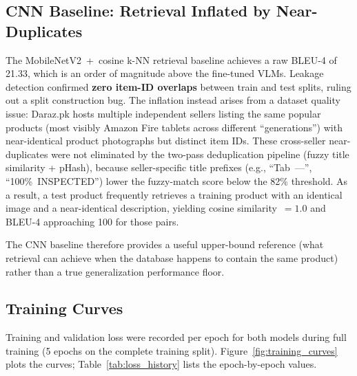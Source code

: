 \documentclass[12pt,a4paper]{article}
\begin{document}
\subsection{CNN Baseline: Retrieval Inflated by Near-Duplicates}
\label{sec:cnn_note}

The MobileNetV2~+~cosine k-NN retrieval baseline achieves a raw BLEU-4 of 21.33,
which is an order of magnitude above the fine-tuned VLMs. Leakage detection confirmed
\textbf{zero item-ID overlaps} between train and test splits, ruling out a split
construction bug. The inflation instead arises from a dataset quality issue: Daraz.pk
hosts multiple independent sellers listing the same popular products (most visibly
Amazon Fire tablets across different ``generations'') with near-identical product
photographs but distinct item IDs. These cross-seller near-duplicates were not eliminated
by the two-pass deduplication pipeline (fuzzy title similarity + pHash), because
seller-specific title prefixes (e.g., ``Tab~---'', ``100\%~INSPECTED'') lower the
fuzzy-match score below the 82\% threshold. As a result, a test product frequently
retrieves a training product with an identical image and a near-identical description,
yielding cosine similarity~$= 1.0$ and BLEU-4 approaching 100 for those pairs.

The CNN baseline therefore provides a useful upper-bound reference (what retrieval can
achieve when the database happens to contain the same product) rather than a true
generalization performance floor.

\subsection{Training Curves}

Training and validation loss were recorded per epoch for both models during full
training (5 epochs on the complete training split). Figure~\ref{fig:training_curves}
plots the curves; Table~\ref{tab:loss_history} lists the epoch-by-epoch values.

\begin{table}[H]
\centering
\caption{Per-epoch train and validation loss for both models. Best epoch (lowest
val loss) shown in \textbf{bold}; both models peak at epoch~1.}
\label{tab:loss_history}
\end{table}
\end{document}
